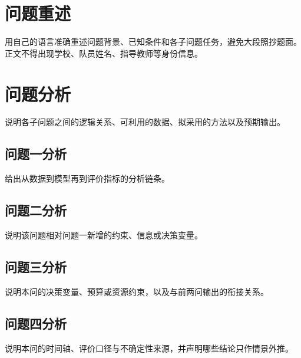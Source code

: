 \documentclass{huawei-cup}
\begin{document}
\maketitlepage

\begin{abstract}
本文针对某某问题，首先说明研究对象、数据来源与任务目标；随后概括数据预处理、模型构建、参数求解和模型检验的完整思路。

针对问题一，建立某某模型，得到主要结果与误差指标。针对问题二，在前述模型基础上引入某某约束，并通过敏感性分析或稳健性检验说明结论的可靠性。针对问题三，构建某某优化模型，给出可复现的求解方案及关键数值结果。针对问题四，给出某某预测或分解结果，并说明其适用条件与不确定性。

最后概括模型的创新点、适用范围与局限性。摘要应写出具体方法、模型、结果、结论和创新点，避免只复述题目或罗列章节。
\end{abstract}

\section{问题重述}
用自己的语言准确重述问题背景、已知条件和各子问题任务，避免大段照抄题面。正文不得出现学校、队员姓名、指导教师等身份信息。

\section{问题分析}
说明各子问题之间的逻辑关系、可利用的数据、拟采用的方法以及预期输出。

\subsection{问题一分析}
给出从数据到模型再到评价指标的分析链条。

\subsection{问题二分析}
说明该问题相对问题一新增的约束、信息或决策变量。

\subsection{问题三分析}
说明本问的决策变量、预算或资源约束，以及与前两问输出的衔接关系。

\subsection{问题四分析}
说明本问的时间轴、评价口径与不确定性来源，并声明哪些结论只作情景外推。
\end{document}
